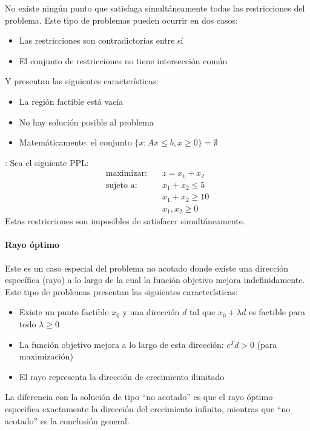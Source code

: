 No existe ningún punto que satisfaga simultáneamente todas las restricciones del problema. Este tipo de problemas pueden ocurrir en dos casos:
\begin{itemize}
  \item Las restricciones son contradictorias entre sí
  \item El conjunto de restricciones no tiene intersección común
\end{itemize}
Y presentan las siguientes características:
\begin{itemize}
  \item La región factible está vacía
  \item No hay solución posible al problema
  \item Matemáticamente: el conjunto \(\{x : Ax \leq b, x \geq 0\} = \emptyset\)
\end{itemize}

\ejemplo : Sea el siguiente PPL:
\begin{align*}
  \text{maximizar:} \quad   &z = x_1 + x_2 \\[3pt]
  \text{sujeto a:} \quad    &x_1 + x_2 \leq 5 \\
                            &x_1 + x_2 \geq 10 \\
                            &x_1, x_2 \geq 0
\end{align*}
Estas restricciones son imposibles de satisfacer simultáneamente.

\paragraph{Rayo óptimo}

Este es un caso especial del problema no acotado donde existe una dirección específica (rayo) a lo largo de la cual la función objetivo mejora indefinidamente. Este tipo de problemas presentan las siguientes características:
\begin{itemize}
  \item Existe un punto factible \(x_0\) y una dirección \(d\) tal que \(x_0 + \lambda d\) es factible para todo \(\lambda \geq 0\)
  \item La función objetivo mejora a lo largo de esta dirección: \(c^T d > 0\) (para maximización)
  \item El rayo representa la dirección de crecimiento ilimitado
\end{itemize}
La diferencia con la solución de tipo ``no acotado'' es que el rayo óptimo especifica exactamente la dirección del crecimiento infinito, mientras que ``no acotado'' es la conclusión general.

